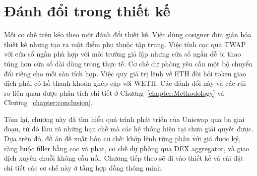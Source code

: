 \documentclass[../DoAn.tex]{subfiles}
\begin{document}
\section{Đánh đổi trong thiết kế}
\label{section:2.7}

Mỗi cơ chế trên kéo theo một đánh đổi thiết kế. Việc dùng cosigner đơn giản hóa thiết kế nhưng tạo ra một điểm phụ thuộc tập trung. Việc tính cọc qua TWAP với cửa sổ ngắn phù hợp với môi trường giả lập nhưng cửa sổ ngắn dễ bị thao túng hơn cửa sổ dài dùng trong thực tế. Cơ chế dự phòng yêu cầu một bộ chuyển đổi riêng cho mỗi sàn tích hợp. Việc quy giá trị lệnh về ETH đòi hỏi token giao dịch phải có hồ thanh khoản ghép cặp với WETH. Các đánh đổi này và các rủi ro liên quan được phân tích chi tiết ở Chương~\ref{chapter:Methodology} và Chương~\ref{chapter:conclusion}.

Tóm lại, chương này đã tìm hiểu quá trình phát triển của Uniswap qua ba giai đoạn, từ đó làm rõ những hạn chế mà các hệ thống hiện tại chưa giải quyết được. Dựa trên đó, đồ án đề xuất bốn cơ chế: khớp lệnh từng phần với giá được ký, ràng buộc filler bằng cọc và phạt, cơ chế dự phòng qua DEX aggregator, và giao dịch xuyên chuỗi không cầu nối. Chương tiếp theo sẽ đi vào thiết kế và cài đặt chi tiết các cơ chế này ở tầng hợp đồng thông minh.
\end{document}
